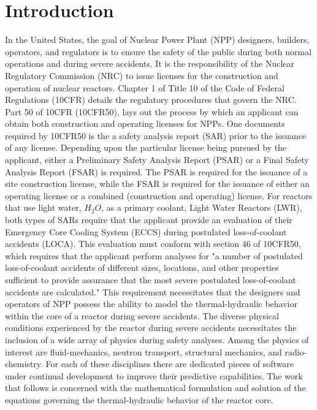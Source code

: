 \chapter{Introduction}
\label{chap:intro}
In the United States, the goal of Nuclear Power Plant (NPP) designers, builders, operators, and regulators is to ensure the safety of the public during both normal operations and during severe accidents.
It is the responsibility of the Nuclear Regulatory Commission (NRC) to issue licenses for the construction and operation of nuclear reactors.
Chapter 1 of Title 10 of the Code of Federal Regulations (10CFR) details the regulatory procedures that govern the NRC.
Part 50 of 10CFR (10CFR50), lays out the process by which an applicant can obtain both construction and operating licenses for NPPs.
One documents required by 10CFR50 is the a safety analysis report (SAR) prior to the issuance of any license.
Depending upon the particular license being pursued by the applicant, either a Preliminary Safety Analysis Report (PSAR) or a Final Safety Analysis Report (FSAR) is required.
The PSAR is required for the issuance of a site construction license, while the FSAR is required for the issuance of either an operating license or a combined (construction and operating) license.
For reactors that use light water, $H_2 O$, as a primary coolant, Light Water Reactors (LWR), both types of SARs require that the applicant provide an evaluation of their Emergency Core Cooling System (ECCS) during postulated loss-of-coolant accidents (LOCA).
This evaluation must conform with section 46 of 10CFR50, which requires that the applicant perform analyses for "a number of postulated loss-of-coolant accidents of different sizes, locations, and other properties sufficient to provide assurance that the most severe postulated loss-of-coolant accidents are calculated."
This requirement necessitates that the designers and operators of NPP possess the ability to model the thermal-hydraulic behavior within the core of a reactor during severe accidents.  
The diverse physical conditions experienced by the reactor during severe accidents necessitates the inclusion of a wide array of physics during safety analyses.
Among the physics of interest are fluid-mechanics, neutron transport, structural mechanics, and radio-chemistry.
For each of these disciplines there are dedicated pieces of software under continual development to improve their predictive capabilities.
The work that follows is concerned with the mathematical formulation and solution of the equations governing the thermal-hydraulic behavior of the reactor core.

